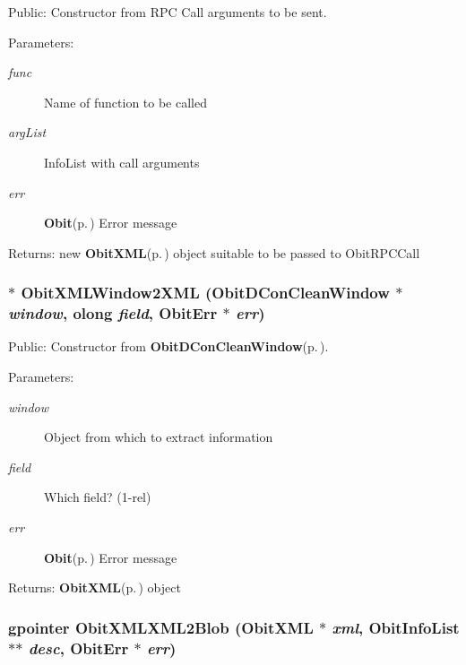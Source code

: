 Public: Constructor from RPC Call arguments to be sent. 

\begin{Desc}
\item[Parameters:]
\begin{description}
\item[{\em func}]Name of function to be called \item[{\em arg\-List}]Info\-List with call arguments \item[{\em err}]{\bf Obit}{\rm (p.\,\pageref{structObit})} Error message \end{description}
\end{Desc}
\begin{Desc}
\item[Returns:]new {\bf Obit\-XML}{\rm (p.\,\pageref{structObitXML})} object suitable to be passed to Obit\-RPCCall \end{Desc}
\subsubsection{$\ast$ Obit\-XMLWindow2XML ({\bf Obit\-DCon\-Clean\-Window} $\ast$ {\em window}, {\bf olong} {\em field}, {\bf Obit\-Err} $\ast$ {\em err})}\label{ObitXML_8h_a28}


Public: Constructor from {\bf Obit\-DCon\-Clean\-Window}{\rm (p.\,\pageref{structObitDConCleanWindow})}. 

\begin{Desc}
\item[Parameters:]
\begin{description}
\item[{\em window}]Object from which to extract information \item[{\em field}]Which field? (1-rel) \item[{\em err}]{\bf Obit}{\rm (p.\,\pageref{structObit})} Error message \end{description}
\end{Desc}
\begin{Desc}
\item[Returns:]{\bf Obit\-XML}{\rm (p.\,\pageref{structObitXML})} object \end{Desc}
\subsubsection{\setlength{\rightskip}{0pt plus 5cm}gpointer Obit\-XMLXML2Blob ({\bf Obit\-XML} $\ast$ {\em xml}, {\bf Obit\-Info\-List} $\ast$$\ast$ {\em desc}, {\bf Obit\-Err} $\ast$ {\em err})}\label{ObitXML_8h_a31}


